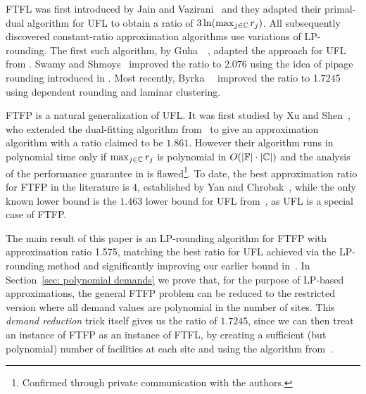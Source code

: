 \documentclass[11pt]{article}
\begin{document}
FTFL was first introduced by Jain and
Vazirani~\cite{JainV03} and they adapted their primal-dual
algorithm for UFL to obtain a ratio of
$3\ln(\max_{j\in\mathbb{C}}r_j)$.  All subsequently
discovered constant-ratio approximation algorithms use
variations of LP-rounding.  The first such algorithm, by
Guha~{\etal}~\cite{GuhaMM01}, adapted the approach for UFL
from \cite{ShmoysTA97}.  Swamy and Shmoys~\cite{SwamyS08}
improved the ratio to $2.076$ using the idea of pipage
rounding introduced in \cite{Svi02}. Most recently,
Byrka~{\etal}~\cite{ByrkaSS10} improved the ratio to 1.7245
using dependent rounding and laminar clustering.

FTFP is a natural generalization of UFL. It was first
studied by Xu and Shen~\cite{XuS09}, who extended the
dual-fitting algorithm from~\cite{JainMMSV03} to give an
approximation algorithm with a ratio claimed to be
$1.861$. However their algorithm runs in polynomial time
only if $\max_{j\in\mathbb{C}} r_j$ is polynomial in
$O(|\mathbb{F}|\cdot |\mathbb{C}|)$ and the analysis of the
performance guarantee in \cite{XuS09} is flawed\footnote{Confirmed through
  private communication with the authors.}.  To date, the
best approximation ratio for FTFP in the literature is $4$,
established by Yan and Chrobak~\cite{YanC11}, while the only
known lower bound is the $1.463$ lower bound for UFL
from~\cite{GuhaK98}, as UFL is a special case of FTFP.

\smallskip

The main result of this paper is an LP-rounding algorithm
for FTFP with approximation ratio 1.575, matching the best
ratio for UFL achieved via the LP-rounding method
\cite{ByrkaGS10} and significantly improving our earlier
bound in~\cite{YanC11}. In Section~\ref{sec: polynomial
  demands} we prove that, for the purpose of LP-based
approximations, the general FTFP problem can be reduced to
the restricted version where all demand values are
polynomial in the number of sites.  This \emph{demand
  reduction} trick itself gives us the ratio of $1.7245$,
since we can then treat an instance of FTFP as an instance
of FTFL, by creating a sufficient (but polynomial) number of
facilities at each site and using the algorithm
from~\cite{ByrkaSS10}.
\end{document}
